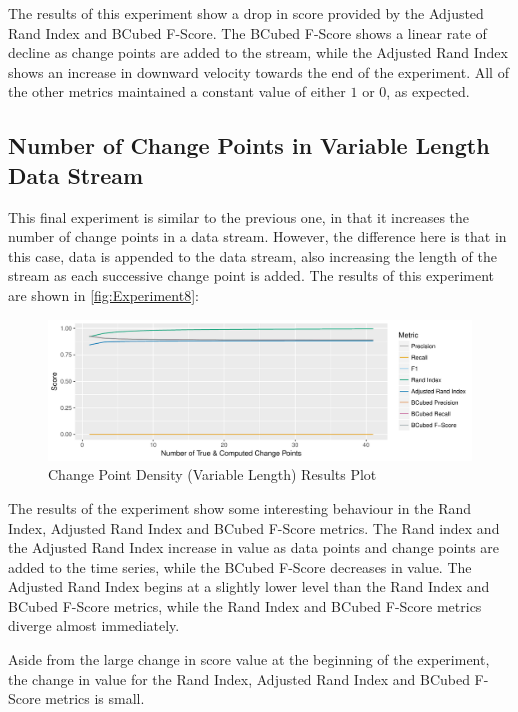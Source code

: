 \documentclass{uvamscse}	%
\begin{document}
The results of this experiment show a drop in score provided by the Adjusted Rand Index and BCubed F-Score. The BCubed F-Score shows a linear rate of decline as change points are added to the stream, while the Adjusted Rand Index shows an increase in downward velocity towards the end of the experiment. All of the other metrics maintained a constant value of either $1$ or $0$, as expected.

\subsection{Number of Change Points in Variable Length Data Stream}

This final experiment is similar to the previous one, in that it increases the number of change points in a data stream. However, the difference here is that in this case, data is appended to the data stream, also increasing the length of the stream as each successive change point is added. The results of this experiment are shown in \autoref{fig:Experiment8}:

\begin{figure}[h]
    \includegraphics[width=\textwidth]{figures/Experiment7}
    \caption{Change Point Density (Variable Length) Results Plot}
    \label{fig:Experiment8}
\end{figure}

The results of the experiment show some interesting behaviour in the Rand Index, Adjusted Rand Index and BCubed F-Score metrics. The Rand index and the Adjusted Rand Index increase in value as data points and change points are added to the time series, while the BCubed F-Score decreases in value. The Adjusted Rand Index begins at a slightly lower level than the Rand Index and BCubed F-Score metrics, while the Rand Index and BCubed F-Score metrics diverge almost immediately.

Aside from the large change in score value at the beginning of the experiment, the change in value for the Rand Index, Adjusted Rand Index and BCubed F-Score metrics is small.
\end{document}
